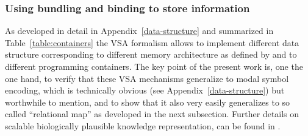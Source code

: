 \documentclass[sn-mathphys]{sn-jnl}
\begin{document}
\subsubsection{Using bundling and binding to store information} \label{containers}

As developed in detail in Appendix~\ref{data-structure} and summarized in Table~\ref{table:containers} the VSA formalism allows to implement different data structure corresponding to different memory architecture as defined by \cite{eichenbaum_memory_2017} and to different programming containers. The key point of the present work is, one the one hand, to verify that these VSA mechanisms generalize to modal symbol encoding, which is technically obvious (see Appendix~\ref{data-structure}) but worthwhile to mention, and to show that it also very easily generalizes to so called ``relational map'' as developed in the next subsection. Further details on scalable biologically plausible knowledge representation, can be found in \cite{crawford_biologically_2016}.
\end{document}
